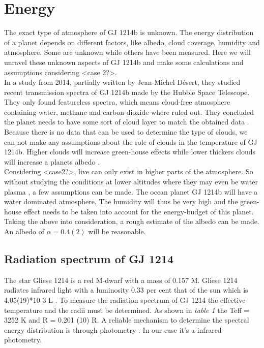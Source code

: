 \documentclass[12pt,a4paper]{article}
\begin{document}

\section{Energy}
The exact type of atmosphere of GJ 1214b is unknown. The energy distribution of a planet depends on different factors, like albedo, cloud coverage, humidity and atmosphere. Some are unknown while others have been measured. Here we will unravel these unknown aspects of GJ 1214b and make some calculations and assumptions considering <case 2?>. \\
In a study from 2014, partially written by Jean-Michel Désert, they studied recent transmission spectra of GJ 1214b made by the Hubble Space Telescope. They only found featureless spectra, which means cloud-free atmosphere containing water, methane and carbon-dioxide where ruled out. They concluded the planet needs to have some sort of cloud layer to match the obtained data \cite{Kreidberg_2014}. Because there is no data that can be used to determine the type of clouds, we can not make any assumptions about the role of clouds in the temperature of GJ 1214b. Higher clouds will increase green-house effects while lower thickers clouds will increase a planets albedo \cite{SteveGrahamClouds}. \\
Considering <case2?>, live can only exist in higher parts of the atmosphere. So without studying the conditions at lower altitudes where they may even be water plasma \cite{Rogers_2010}, a few assumptions can be made. The ocean planet GJ 1214b will have a water dominated atmosphere. The humidity will thus be very high and the green-house effect needs to be taken into account for the energy-budget of this planet. \\
Taking the above into consideration, a rough estimate of the albedo can be made. An albedo of $\alpha = 0.4(2)$ will be reasonable.  
\subsection{Radiation spectrum of GJ 1214}
The star Gliese 1214 is a red M-dwarf with a mass of 0.157 M. Gliese 1214 radiates infrared light with a luminosity 0.33 per cent that of the sun which is 4.05(19)*10-3 L \cite{Anglada_2013}. To measure the radiation spectrum of GJ 1214 the effective temperature and the radii must be determined. As shown in \textit{table 1} the Teff = 3252 K and R = 0.201 (10) R. A reliable mechanism to determine the spectral energy distribution is through photometry \cite{Anglada_2013}. In our case it’s a infrared photometry. 
\end{document}
